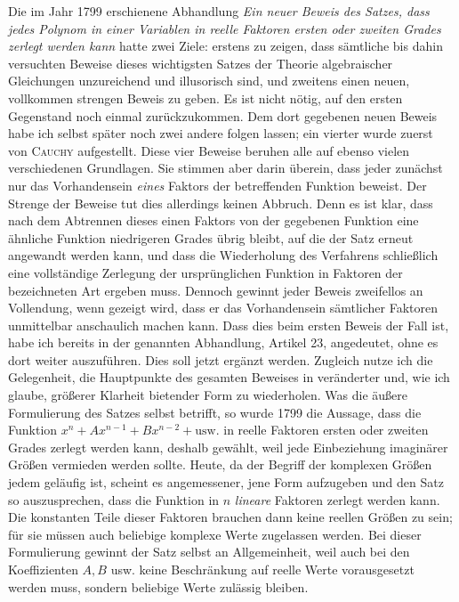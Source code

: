 Die im Jahr 1799 erschienene Abhandlung \emph{Ein neuer Beweis des Satzes, dass jedes Polynom in einer Variablen in reelle Faktoren ersten oder zweiten Grades zerlegt werden kann} hatte zwei Ziele: erstens zu zeigen, dass sämtliche bis dahin versuchten Beweise dieses wichtigsten Satzes der Theorie algebraischer Gleichungen unzureichend und illusorisch sind, und zweitens einen neuen, vollkommen strengen Beweis zu geben. Es ist nicht nötig, auf den ersten Gegenstand noch einmal zurückzukommen. Dem dort gegebenen neuen Beweis habe ich selbst später noch zwei andere folgen lassen; ein vierter wurde zuerst von \textsc{Cauchy} aufgestellt. Diese vier Beweise beruhen alle auf ebenso vielen verschiedenen Grundlagen. Sie stimmen aber darin überein, dass jeder zunächst nur das Vorhandensein \emph{eines} Faktors der betreffenden Funktion beweist. Der Strenge der Beweise tut dies allerdings keinen Abbruch. Denn es ist klar, dass nach dem Abtrennen dieses einen Faktors von der gegebenen Funktion eine ähnliche Funktion niedrigeren Grades übrig bleibt, auf die der Satz erneut angewandt werden kann, und dass die Wiederholung des Verfahrens schließlich eine vollständige Zerlegung der ursprünglichen Funktion in Faktoren der bezeichneten Art ergeben muss. Dennoch gewinnt jeder Beweis zweifellos an Vollendung, wenn gezeigt wird, dass er das Vorhandensein sämtlicher Faktoren unmittelbar anschaulich machen kann. Dass dies beim ersten Beweis der Fall ist, habe ich bereits in der genannten Abhandlung, Artikel 23, angedeutet, ohne es dort weiter auszuführen. Dies soll jetzt ergänzt werden. Zugleich nutze ich die Gelegenheit, die Hauptpunkte des gesamten Beweises in veränderter und, wie ich glaube, größerer Klarheit bietender Form zu wiederholen. Was die äußere Formulierung des Satzes selbst betrifft, so wurde 1799 die Aussage, dass die Funktion $x^n+Ax^{n-1}+Bx^{n-2}+\mathrm{usw.}$ in reelle Faktoren ersten oder zweiten Grades zerlegt werden kann, deshalb gewählt, weil jede Einbeziehung imaginärer Größen vermieden werden sollte. Heute, da der Begriff der komplexen Größen jedem geläufig ist, scheint es angemessener, jene Form aufzugeben und den Satz so auszusprechen, dass die Funktion in $n$ \emph{lineare} Faktoren zerlegt werden kann. Die konstanten Teile dieser Faktoren brauchen dann keine reellen Größen zu sein; für sie müssen auch beliebige komplexe Werte zugelassen werden. Bei dieser Formulierung gewinnt der Satz selbst an Allgemeinheit, weil auch bei den Koeffizienten $A,B$ usw. keine Beschränkung auf reelle Werte vorausgesetzt werden muss, sondern beliebige Werte zulässig bleiben.

